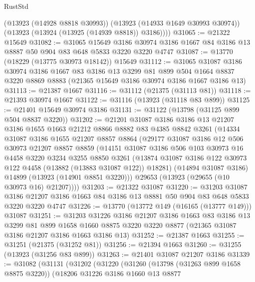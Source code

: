 \begin{lexlean}{RustStd}
\begin{coremodule}
        (@13923 (@14928 @8818 @30993))
        (@13923 (@14933 @1649 @30993 @30974))
        (@13923 (@13924 (@13925 (@14939 @8818)) @3186))))
@31065 := @21322 @15649
@31082 := @31065
    @15649
    @3186
    @30974
    @3186
    @1667
    @84
    @3186
    @13
    @8887
    @50
    @904
    @83
    @648
    @5833
    @3220
    @3220
    @4747
@31087 := @13770 (@18229 (@13775 @30973 @18142)) @15649
@31112 := @31065
    @31087
    @3186
    @30974
    @3186
    @1667
    @83
    @3186
    @13
    @3299
    @81
    @899
    @504
    @1664
    @8837
    @3220
    @8869
    @8883
    (@21365 @15649 @3186 @30974 @3186 @1667 @3186 @13)
@31113 := @21387 @1667
@31116 := @31112 (@21375 (@31113 @81))
@31118 := @21393 @30974 @1667
@31122 := @31116 (@13923 (@31118 @83 @899))
@31125 := @21401 @15649 @30974 @3186
@31131 := @31122 (@13798 (@31125 @899 @504 @8837 @3220))
@31202 := @21201
    @31087
    @3186
    @3186
    @13
    @21207
    @3186
    @1655
    @1663
    @21212
    @8866
    @8882
    @83
    @4385
    @8842
    @3261
    (@14334
      @31087
      @3186
      @1655
      @21207
      @8857
      @8864
      (@29177
        @31087
        @3186
        @12
        @506
        @30973
        @21207
        @8857
        @8859
        (@14151
          @31087
          @3186
          @506
          @103
          @30973
          @16
          @4458
          @3220
          @3234
          @3255
          @8850
          @3261
          (@13874 @31087 @3186 @122 @30973 @122 @4458 (@13882 (@13883 @31087 @122)) @18281)
          (@14894 @31087 @3186)
          @14899
          (@13923 (@14901 @8851 @3220)))
        @29653
        (@13923 (@29655 (@10 @30973 @16) @21207))))
@31203 := @21322 @31087
@31220 := @31203
    @31087
    @3186
    @21207
    @3186
    @1663
    @84
    @3186
    @13
    @8881
    @50
    @904
    @83
    @648
    @5833
    @3220
    @3220
    @4747
@31226 := @13770 (@13772 @149 (@16165 (@13777 @149))) @31087
@31251 := @31203
    @31226
    @3186
    @21207
    @3186
    @1663
    @83
    @3186
    @13
    @3299
    @81
    @899
    @1658
    @1660
    @8875
    @3220
    @3220
    @8877
    (@21365 @31087 @3186 @21207 @3186 @1663 @3186 @13)
@31252 := @21387 @1663
@31255 := @31251 (@21375 (@31252 @81))
@31256 := @21394 @1663
@31260 := @31255 (@13923 (@31256 @83 @899))
@31263 := @21401 @31087 @21207 @3186
@31339 := @31082
    (@31131
      (@31202
        (@31220
          (@31260
            (@13798 (@31263 @899 @1658 @8875 @3220))
            (@18206
              @31226
              @3186
              @1660
              @13
              @8877

\end{coremodule}
\end{lexlean}
